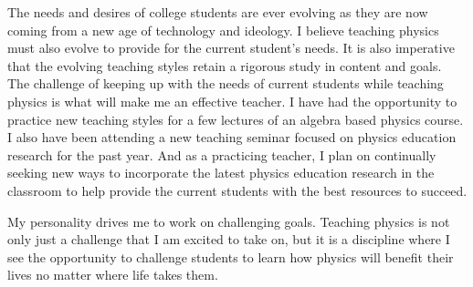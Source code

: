 \documentclass[11pt, a4paper]{awesome-cv} %
\begin{document}
\begin{cvletter}

\hspace{10pt} The needs and desires of college students are ever evolving as they are now coming from a new age of technology and ideology.  I believe teaching physics must also evolve to provide for the current student’s needs.  It is also imperative that the evolving teaching styles retain a rigorous study in content and goals.  The challenge of keeping up with the needs of current students while teaching physics is what will make me an effective teacher.  I have had the opportunity to practice new teaching styles for a few lectures of an algebra based physics course.  I also have been attending a new teaching seminar focused on physics education research for the past year.  And as a practicing teacher, I plan on continually seeking new ways to incorporate the latest physics education research in the classroom to help provide the current students with the best resources to succeed.



  
\hspace{10pt} My personality drives me to work on challenging goals.  Teaching physics is not only just a challenge that I am excited to take on, but it is a discipline where I see the opportunity to challenge students to learn how physics will benefit their lives no matter where life takes them.



\end{cvletter}


\makeletterclosing %
\end{document}

